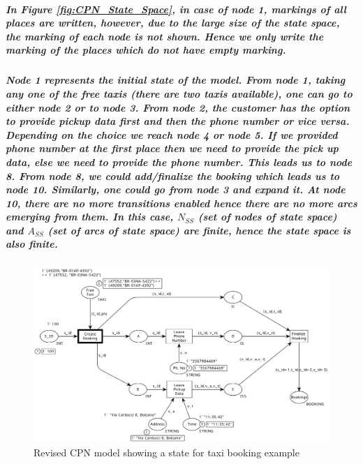 \subparagraph*{\textnormal{In Figure \ref{fig:CPN_State_Space}, in case of node 1, markings of all places are written, however, due to the large size of the state space, the marking of each node is not shown. Hence we only write the marking of the places which do not have empty marking.}}

\subparagraph*{\textnormal{Node 1 represents the initial state of the model. From node 1, taking any one of the free taxis (there are two taxis available), one can go to either node 2 or to node 3. From node 2, the customer has the option to provide pickup data first and then the phone number or vice versa. Depending on the choice we reach node 4 or node 5. If we provided phone number at the first place then we need to provide the pick up data, else we need to provide the phone number. This leads us to node 8. From node 8, we could add/finalize the booking which leads us to node 10. Similarly, one could go from node 3 and expand it. At node 10, there are no more transitions enabled hence there are no more arcs emerging from them. In this case, $\mathit{N_{SS}}$ (set of nodes of state space) and $\mathit{A_{SS}}$ (set of arcs of state space) are finite, hence the state space is also finite.}}

\begin{figure}[!htbp]
	\centering
	\includegraphics[scale = 0.4]{CPN_Taxi_Booking_simple.pdf}
	\caption{Revised CPN model showing a state for taxi booking example}
	\label{fig:CPN_Taxi_Booking_simple}
\end{figure}

